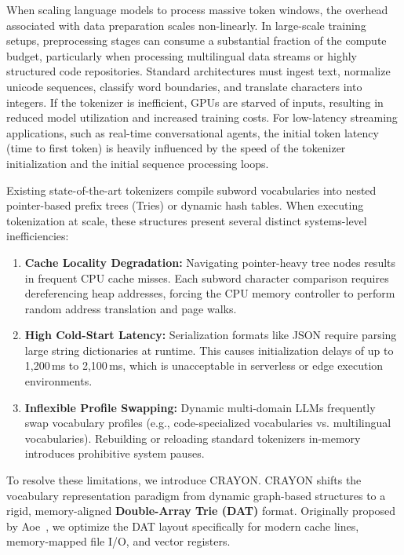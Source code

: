 \documentclass[10pt,journal,compsoc]{IEEEtran}
\begin{document}
When scaling language models to process massive token windows, the overhead associated with data preparation scales non-linearly. In large-scale training setups, preprocessing stages can consume a substantial fraction of the compute budget, particularly when processing multilingual data streams or highly structured code repositories. Standard architectures must ingest text, normalize unicode sequences, classify word boundaries, and translate characters into integers. If the tokenizer is inefficient, GPUs are starved of inputs, resulting in reduced model utilization and increased training costs. For low-latency streaming applications, such as real-time conversational agents, the initial token latency (time to first token) is heavily influenced by the speed of the tokenizer initialization and the initial sequence processing loops.

Existing state-of-the-art tokenizers compile subword vocabularies into nested pointer-based prefix trees (Tries) or dynamic hash tables. When executing tokenization at scale, these structures present several distinct systems-level inefficiencies:
\begin{enumerate}
    \item \textbf{Cache Locality Degradation:} Navigating pointer-heavy tree nodes results in frequent CPU cache misses. Each subword character comparison requires dereferencing heap addresses, forcing the CPU memory controller to perform random address translation and page walks.
    \item \textbf{High Cold-Start Latency:} Serialization formats like JSON require parsing large string dictionaries at runtime. This causes initialization delays of up to 1,200\,ms to 2,100\,ms, which is unacceptable in serverless or edge execution environments.
    \item \textbf{Inflexible Profile Swapping:} Dynamic multi-domain LLMs frequently swap vocabulary profiles (e.g., code-specialized vocabularies vs. multilingual vocabularies). Rebuilding or reloading standard tokenizers in-memory introduces prohibitive system pauses.
\end{enumerate}

To resolve these limitations, we introduce CRAYON. CRAYON shifts the vocabulary representation paradigm from dynamic graph-based structures to a rigid, memory-aligned \textbf{Double-Array Trie (DAT)} format. Originally proposed by Aoe~\cite{aoe1989efficient}, we optimize the DAT layout specifically for modern cache lines, memory-mapped file I/O, and vector registers.
\end{document}
